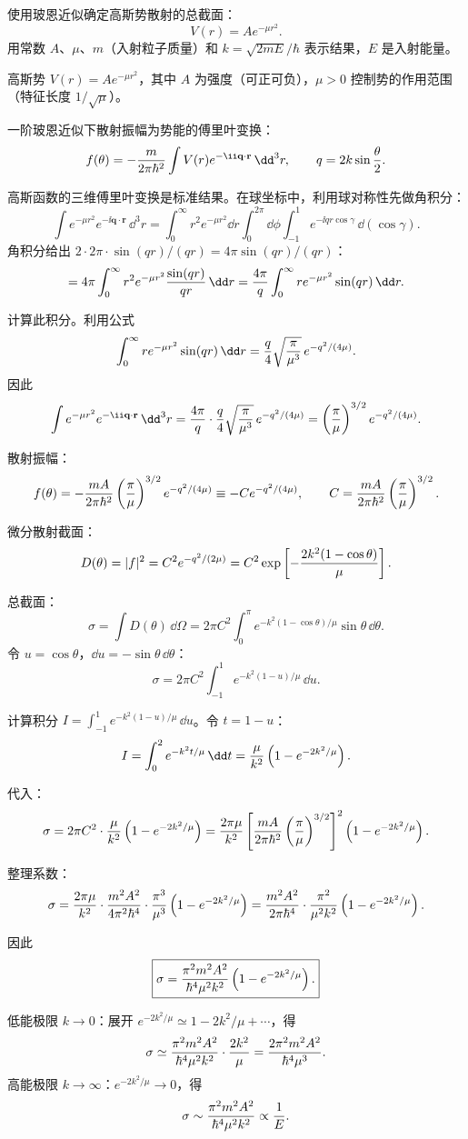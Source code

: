 \begin{question}
使用玻恩近似确定高斯势散射的总截面：
\[
V(r)=Ae^{-\mu r^2}.
\]
用常数 $A$、$\mu$、$m$（入射粒子质量）和 $k=\sqrt{2mE}/\hbar$ 表示结果，$E$ 是入射能量。
\end{question}
\begin{solution}
高斯势 $V(r)=Ae^{-\mu r^2}$，其中 $A$ 为强度（可正可负），$\mu>0$ 控制势的作用范围（特征长度 $1/\sqrt{\mu}$）。

一阶玻恩近似下散射振幅为势能的傅里叶变换：
\[
f(\theta)=-{m\over2\pi\hbar^2}\int V(r)e^{-\ii\mathbf q\cdot\mathbf r}\,\dd^3r,
\qquad q=2k\sin{\theta\over2}.
\]

高斯函数的三维傅里叶变换是标准结果。在球坐标中，利用球对称性先做角积分：
\[
\int e^{-\mu r^2}e^{-\ii\mathbf q\cdot\mathbf r}\,\dd^3r
=\int_0^\infty r^2e^{-\mu r^2}\dd r\int_0^{2\pi}\dd\phi\int_{-1}^{1}e^{-\ii qr\cos\gamma}\,\dd(\cos\gamma).
\]
角积分给出 $2\cdot{2\pi}\cdot{\sin(qr)/(qr)}=4\pi\sin(qr)/(qr)$：
\[
=4\pi\int_0^\infty r^2e^{-\mu r^2}{\sin(qr)\over qr}\,\dd r
={4\pi\over q}\int_0^\infty r e^{-\mu r^2}\sin(qr)\,\dd r.
\]

计算此积分。利用公式
\[
\int_0^\infty r e^{-\mu r^2}\sin(qr)\,\dd r={q\over4}\sqrt{\pi\over\mu^3}\,e^{-q^2/(4\mu)}.
\]
因此
\[
\int e^{-\mu r^2}e^{-\ii\mathbf q\cdot\mathbf r}\,\dd^3r
={4\pi\over q}\cdot{q\over4}\sqrt{\pi\over\mu^3}\,e^{-q^2/(4\mu)}
=\left({\pi\over\mu}\right)^{3/2}e^{-q^2/(4\mu)}.
\]

散射振幅：
\[
f(\theta)=-{mA\over2\pi\hbar^2}\left({\pi\over\mu}\right)^{3/2}e^{-q^2/(4\mu)}
\equiv-Ce^{-q^2/(4\mu)},
\qquad C={mA\over2\pi\hbar^2}\left({\pi\over\mu}\right)^{3/2}.
\]

微分散射截面：
\[
D(\theta)=|f|^2=C^2e^{-q^2/(2\mu)}=C^2\exp\left[-{2k^2(1-\cos\theta)\over\mu}\right].
\]

总截面：
\[
\sigma=\int D(\theta)\,\dd\Omega
=2\pi C^2\int_{0}^{\pi}e^{-k^2(1-\cos\theta)/\mu}\sin\theta\,\dd\theta.
\]
令 $u=\cos\theta$，$\dd u=-\sin\theta\,\dd\theta$：
\[
\sigma=2\pi C^2\int_{-1}^{1}e^{-k^2(1-u)/\mu}\,\dd u.
\]

计算积分 $\displaystyle I=\int_{-1}^{1}e^{-k^2(1-u)/\mu}\,\dd u$。令 $t=1-u$：
\[
I=\int_{0}^{2}e^{-k^2t/\mu}\,\dd t
={\mu\over k^2}\left(1-e^{-2k^2/\mu}\right).
\]

代入：
\[
\sigma=2\pi C^2\cdot{\mu\over k^2}\left(1-e^{-2k^2/\mu}\right)
={2\pi\mu\over k^2}\left[{mA\over2\pi\hbar^2}\left({\pi\over\mu}\right)^{3/2}\right]^2\left(1-e^{-2k^2/\mu}\right).
\]

整理系数：
\[
\sigma={2\pi\mu\over k^2}\cdot{m^2A^2\over4\pi^2\hbar^4}\cdot{\pi^3\over\mu^3}\left(1-e^{-2k^2/\mu}\right)
={m^2A^2\over2\pi\hbar^4}\cdot{\pi^2\over\mu^2k^2}\left(1-e^{-2k^2/\mu}\right).
\]

因此
\[
\boxed{\sigma={\pi^2 m^2 A^2\over\hbar^4\mu^2k^2}\left(1-e^{-2k^2/\mu}\right).}
\]

低能极限 $k\to0$：展开 $e^{-2k^2/\mu}\simeq 1-2k^2/\mu+\cdots$，得
\[
\sigma\simeq{\pi^2 m^2 A^2\over\hbar^4\mu^2k^2}\cdot{2k^2\over\mu}
={2\pi^2 m^2 A^2\over\hbar^4\mu^3}.
\]
高能极限 $k\to\infty$：$e^{-2k^2/\mu}\to0$，得
\[
\sigma\sim{\pi^2 m^2 A^2\over\hbar^4\mu^2k^2}\propto{1\over E}.
\]
\end{solution}

